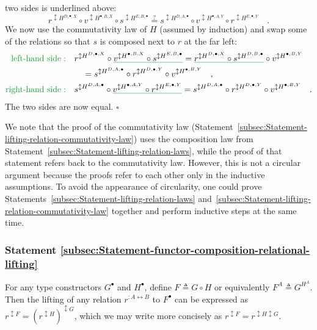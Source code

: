 two sides is underlined above:
\[
r^{\updownarrow H^{D,\bullet,X}}\circ v^{\updownarrow H^{\bullet,B,X}}\circ s^{\updownarrow H^{E,B,\bullet}}\overset{?}{=}s^{\updownarrow H^{D,A,\bullet}}\circ v^{\updownarrow H^{\bullet,A,Y}}\circ r^{\updownarrow H^{E,\bullet,Y}}\quad.
\]
We now use the commutativity law of $H$ (assumed by induction) and
swap some of the relations so that $s$ is composed next to $r$ at
the far left:
\begin{align*}
{\color{greenunder}\text{left-hand side}:}\quad & r^{\updownarrow H^{D,\bullet,X}}\circ\gunderline{v^{\updownarrow H^{\bullet,B,X}}\circ s^{\updownarrow H^{E,B,\bullet}}}=\gunderline{r^{\updownarrow H^{D,\bullet,X}}\circ s^{\updownarrow H^{D,B,\bullet}}}\circ v^{\updownarrow H^{\bullet,B,Y}}\\
 & \quad=s^{\updownarrow H^{D,A,\bullet}}\circ r^{\updownarrow H^{D,\bullet,Y}}\circ v^{\updownarrow H^{\bullet,B,Y}}\quad,\\
{\color{greenunder}\text{right-hand side}:}\quad & s^{\updownarrow H^{D,A,\bullet}}\circ\gunderline{v^{\updownarrow H^{\bullet,A,Y}}\circ r^{\updownarrow H^{E,\bullet,Y}}}=s^{\updownarrow H^{D,A,\bullet}}\circ r^{\updownarrow H^{D,\bullet,Y}}\circ v^{\updownarrow H^{\bullet,B,Y}}\quad.
\end{align*}
The two sides are now equal. $\square$

We note that the proof of the commutativity law (Statement~\ref{subsec:Statement-lifting-relation-commutativity-law})
uses the composition law from Statement~\ref{subsec:Statement-lifting-relation-laws},
while the proof of that statement refers back to the commutativity
law. However, this is not a circular argument because the proofs refer
to each other only in the inductive assumptions. To avoid the appearance
of circularity, one could prove Statements~\ref{subsec:Statement-lifting-relation-laws}
and~\ref{subsec:Statement-lifting-relation-commutativity-law} together
and perform inductive steps at the same time.

\subsubsection{Statement \label{subsec:Statement-functor-composition-relational-lifting}\ref{subsec:Statement-functor-composition-relational-lifting}}

For any type constructors $G^{\bullet}$ and $H^{\bullet}$, define
$F\triangleq G\circ H$ or equivalently $F^{A}\triangleq G^{H^{A}}$.
Then the lifting of any relation $r^{:A\leftrightarrow B}$ to $F^{\bullet}$
can be expressed as $r^{\updownarrow F}=(r^{\updownarrow H})^{\updownarrow G}$,
which we may write more concisely as $r^{\updownarrow F}=r^{\updownarrow H\updownarrow G}$.

